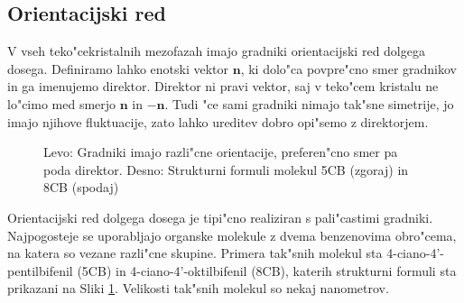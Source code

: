 \documentclass[a4paper,10pt]{article}
\begin{document}
\subsection{Orientacijski red}

V vseh teko"cekristalnih mezofazah imajo gradniki orientacijski red dolgega dosega. Definiramo lahko enotski vektor $\mathbf{n}$, ki dolo"ca povpre"cno smer gradnikov in ga imenujemo direktor. Direktor ni pravi vektor, saj v teko"cem kristalu ne lo"cimo med smerjo $\mathbf{n}$ in $\mathbf{-n}$. Tudi "ce sami gradniki nimajo tak"sne simetrije, jo imajo njihove fluktuacije, zato lahko ureditev dobro opi"semo z direktorjem\cite{mermin}. 

\begin{figure}[h]
\begin{center}
 \caption{Levo: Gradniki imajo razli"cne orientacije, preferen"cno smer pa poda direktor. Desno: Strukturni formuli molekul 5CB (zgoraj) in 8CB (spodaj)\cite{wiki:lc}}
 \label{fig:nematik-direktor}
 \end{center}
\end{figure}

Orientacijski red dolgega dosega je tipi"cno realiziran s pali"castimi gradniki. Najpogosteje se uporabljajo organske molekule z dvema benzenovima obro"cema, na katera so vezane razli"cne skupine. Primera tak"snih molekul sta 4-ciano-4'-pentilbifenil (5CB) in 4-ciano-4'-oktilbifenil (8CB), katerih strukturni formuli sta prikazani na Sliki \ref{fig:nematik-direktor}. Velikosti tak"snih molekul so nekaj nanometrov. 
\end{document}
